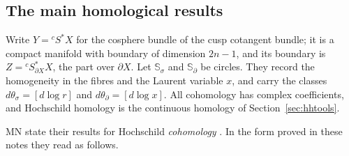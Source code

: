 \documentclass[11pt,oneside,reqno]{article}
\newcommand{\Y}{{}^cS^*X}
\newcommand{\Zb}{{}^cS^*_{\partial X}X}
\newcommand{\Ssig}{\mathbb S_\sigma}
\newcommand{\Sd}{\mathbb S_\partial}
\theoremstyle{plain}
\theoremstyle{definition}
\theoremstyle{remark}
\begin{document}
\subsection{The main homological results}\label{subsec:mainresults}
Write \(Y=\Y\) for the cosphere bundle of the cusp cotangent bundle; it
is a compact manifold with boundary of dimension \(2n-1\), and its
boundary is \(Z=\Zb\), the part over \(\partial X\). Let \(\Ssig\) and
\(\Sd\) be circles. They record the homogeneity in the fibres and the
Laurent variable \(x\), and carry the classes \(d\theta_\sigma=[d\log r]\)
and \(d\theta_\partial=[d\log x]\). All cohomology has complex
coefficients, and Hochschild homology is the continuous homology of
Section~\ref{sec:hhtools}.

MN state their results for Hochschild \emph{cohomology}
\cite[(16)]{MN}. In the form proved in these notes they read as follows.
\end{document}
